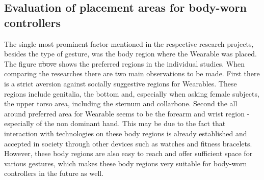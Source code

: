 \documentclass{sigchi}
\providecommand{\DIFaddtex}[1]{{\protect\color{blue}\uwave{#1}}} %
\providecommand{\DIFdeltex}[1]{{\protect\color{red}\sout{#1}}}                      %
\providecommand{\DIFaddbegin}{} %
\providecommand{\DIFaddend}{} %
\providecommand{\DIFdelbegin}{} %
\providecommand{\DIFdelend}{} %
\providecommand{\DIFadd}[1]{\texorpdfstring{\DIFaddtex{#1}}{#1}} %
\providecommand{\DIFdel}[1]{\texorpdfstring{\DIFdeltex{#1}}{}} %
\newcommand{\DIFscaledelfig}{0.5}
\newlength{\DIFdelgraphicswidth} %
\newlength{\DIFdelgraphicsheight} %
\newcommand{\DIFaddincludegraphics}[2][]{{\color{blue}\fbox{\DIFOincludegraphics[#1]{#2}}}} %
\newcommand{\DIFdelincludegraphics}[2][]{%
\sbox{\DIFdelgraphicsbox}{\DIFOincludegraphics[#1]{#2}}%
\settoboxwidth{\DIFdelgraphicswidth}{\DIFdelgraphicsbox} %
\settoboxtotalheight{\DIFdelgraphicsheight}{\DIFdelgraphicsbox} %
\scalebox{\DIFscaledelfig}{%
\parbox[b]{\DIFdelgraphicswidth}{\usebox{\DIFdelgraphicsbox}\\[-\baselineskip] \rule{\DIFdelgraphicswidth}{0em}}\llap{\resizebox{\DIFdelgraphicswidth}{\DIFdelgraphicsheight}{%
\setlength{\unitlength}{\DIFdelgraphicswidth}%
\begin{picture}(1,1)%
\thicklines\linethickness{2pt} %
{\color[rgb]{1,0,0}\put(0,0){\framebox(1,1){}}}%
{\color[rgb]{1,0,0}\put(0,0){\line( 1,1){1}}}%
{\color[rgb]{1,0,0}\put(0,1){\line(1,-1){1}}}%
\end{picture}%
}\hspace*{3pt}}} %
} %
\DeclareRobustCommand{\DIFaddbegin}{\DIFOaddbegin \let\includegraphics\DIFaddincludegraphics} %
\DeclareRobustCommand{\DIFaddend}{\DIFOaddend \let\includegraphics\DIFOincludegraphics} %
\DeclareRobustCommand{\DIFdelbegin}{\DIFOdelbegin \let\includegraphics\DIFdelincludegraphics} %
\DeclareRobustCommand{\DIFdelend}{\DIFOaddend \let\includegraphics\DIFOincludegraphics} %
\begin{document}
\subsection{Evaluation of placement areas for body-worn controllers }
The single most prominent factor mentioned in the respective research projects, besides the type of gesture, was the body region where the Wearable was placed. The figure \DIFdelbegin \DIFdel{above }\DIFdelend \DIFaddbegin \DIFadd{\ref{fig:body} }\DIFaddend shows the preferred regions in the individual studies. When comparing the researches there are two main observations to be made. First there is a strict aversion against socially suggestive regions for Wearables. These regions include genitalia, the bottom and, especially when asking female subjects, the upper torso area, including the sternum and collarbone.
Second the all around preferred area for Wearable seems to be the forearm and wrist region - especially of the non dominant hand. \cite{touch-wrist,pinstripe,social-comfort,belt} %
This may be due to the fact that interaction with technologies on these body regions is already established and accepted in society through other devices such as watches and fitness bracelets. However, these body regions are also easy to reach and offer sufficient space for various gestures, which makes these body regions very suitable for body-worn controllers in the future as well.
\end{document}
